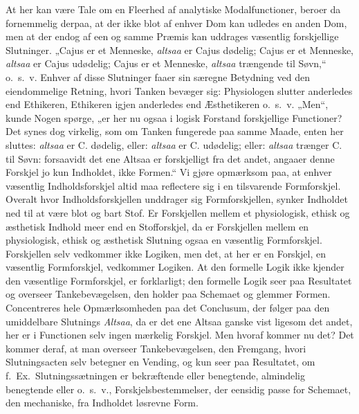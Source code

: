 \documentclass[12pt]{book}
\newcommand{\opage}[1]{\marginnote{\footnotesize\textit{[#1]}}}
\begin{document}
At her kan være Tale om en Fleerhed af analytiske Modalfunctioner, beroer da fornemmelig derpaa, at der ikke blot af enhver Dom kan udledes en anden Dom, men at der endog af een og samme Præmis kan uddrages væsentlig forskjellige Slutninger. „Cajus er et Menneske, \emph{altsaa} er Cajus dødelig; Cajus er et Menneske, \emph{altsaa} er Cajus udødelig; Cajus er et Menneske, \emph{altsaa} trængende til Søvn,“ o.\ s.\ v. Enhver af disse Slutninger faaer sin særegne Betydning ved den eiendommelige Retning, hvori Tanken bevæger sig: Physiologen slutter anderledes end Ethikeren, Ethikeren igjen anderledes end Æsthetikeren o.\ s.\ v. „Men“, kunde Nogen spørge, „er her nu ogsaa i logisk Forstand forskjellige Functioner? Det synes dog virkelig, som om Tanken fungerede paa samme Maade, enten her sluttes: \emph{altsaa} er C. dødelig, eller: \emph{altsaa} er C. udødelig; eller: \emph{altsaa} trænger C. til Søvn: forsaavidt det ene Altsaa er forskjelligt fra det andet, angaaer denne Forskjel jo kun Indholdet, ikke Formen.“ Vi gjøre opmærksom paa, at enhver væsentlig Indholdsforskjel altid maa reflectere sig i en tilsvarende Formforskjel. Overalt hvor Indholdsforskjellen unddrager sig Formforskjellen, synker Indholdet ned til at være blot og bart Stof. Er Forskjellen mellem et physiologisk, ethisk og æsthetisk Indhold meer end en Stofforskjel, da er Forskjellen mellem en physiologisk,
\opage{308}ethisk og æsthetisk Slutning ogsaa en væsentlig Formforskjel. Forskjellen selv vedkommer ikke Logiken, men det, at her er en Forskjel, en væsentlig Formforskjel, vedkommer Logiken. At den formelle Logik ikke kjender den væsentlige Formforskjel, er forklarligt; den formelle Logik seer paa Resultatet og overseer Tankebevægelsen, den holder paa Schemaet og glemmer Formen. Concentreres hele Opmærksomheden paa det Conclusum, der følger paa den umiddelbare Slutnings \emph{Altsaa}, da er det ene Altsaa ganske vist ligesom det andet, her er i Functionen selv ingen mærkelig Forskjel. Men hvoraf kommer nu det? Det kommer deraf, at man overseer Tankebevægelsen, den Fremgang, hvori Slutningsacten selv betegner en Vending, og kun seer paa Resultatet, om f.\ Ex.\ Slutningssætningen er bekræftende eller benegtende, almindelig benegtende eller o.\ s.\ v., Forskjelsbestemmelser, der eensidig passe for Schemaet, den mechaniske, fra Indholdet løsrevne Form.
\end{document}
